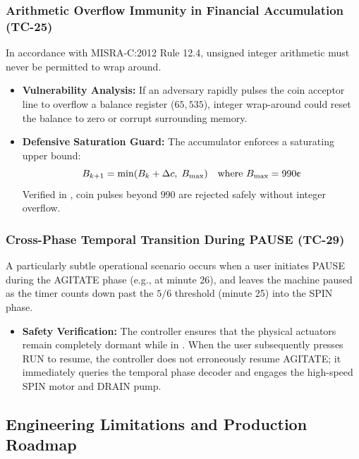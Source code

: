 \subsubsection{Arithmetic Overflow Immunity in Financial Accumulation (TC-25)}
In accordance with MISRA-C:2012 Rule 12.4, unsigned integer arithmetic must never be permitted to wrap around.
\begin{itemize}
  \item \textbf{Vulnerability Analysis:} If an adversary rapidly pulses the coin acceptor line to overflow a  balance register ($65{,}535$\cent), integer wrap-around could reset the balance to zero or corrupt surrounding memory.
  \item \textbf{Defensive Saturation Guard:} The accumulator enforces a saturating upper bound:
        \begin{equation}
          B_{k+1} = \min(B_k + \Delta c, \; B_{\text{max}}) \quad \text{where } B_{\text{max}} = 990\text{\cent}
        \end{equation}
        Verified in , coin pulses beyond $990$\cent{} are rejected safely without integer overflow.
\end{itemize}

\subsubsection{Cross-Phase Temporal Transition During PAUSE (TC-29)}
A particularly subtle operational scenario occurs when a user initiates PAUSE during the AGITATE phase (e.g., at minute 26), and leaves the machine paused as the timer counts down past the $5/6$ threshold (minute 25) into the SPIN phase.
\begin{itemize}
  \item \textbf{Safety Verification:} The controller ensures that the physical actuators remain completely dormant while in . When the user subsequently presses RUN to resume, the controller does not erroneously resume AGITATE; it immediately queries the temporal phase decoder and engages the high-speed SPIN motor and DRAIN pump.
\end{itemize}

\subsection{Engineering Limitations and Production Roadmap}

